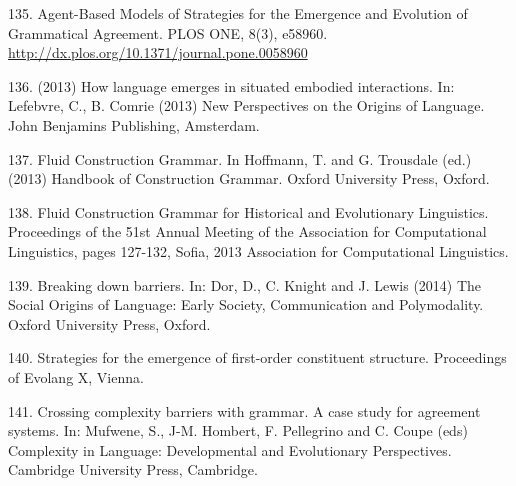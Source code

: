 135. \citet{Beuls:13a} Agent-Based Models of Strategies for the Emergence and Evolution of Grammatical Agreement. PLOS ONE, 8(3), e58960. \url{http://dx.plos.org/10.1371/journal.pone.0058960}

136. \citet{Steels:13b} (2013) How language emerges in situated embodied interactions. In: Lefebvre, C., B. Comrie (2013) New Perspectives on the Origins of Language. John Benjamins Publishing, Amsterdam. 

137. \citet{Steels:13c} Fluid Construction Grammar. In Hoffmann, T. and G. Trousdale (ed.) (2013) Handbook of Construction Grammar. Oxford University Press, Oxford. 

138. \citet{wellens:13d} Fluid Construction Grammar for Historical and Evolutionary Linguistics. Proceedings of the 51st Annual Meeting of the Association for Computational Linguistics, pages 127-132, Sofia, 2013 Association for Computational Linguistics.

139. \citet{Steels:14a} Breaking down barriers. In: Dor, D., C. Knight and J. Lewis (2014) The Social Origins of Language: Early Society, Communication and Polymodality. Oxford University Press, Oxford. 

140. \citet{Garcia:14b} Strategies for the emergence of first-order constituent structure. Proceedings of 
Evolang X, Vienna. 

141. \citet{Steels:14c} Crossing complexity barriers with grammar. A case study for agreement systems. In: Mufwene, S., J-M. Hombert, F. Pellegrino and C. Coupe (eds) Complexity in Language: Developmental and Evolutionary Perspectives. Cambridge University Press, Cambridge. 
  